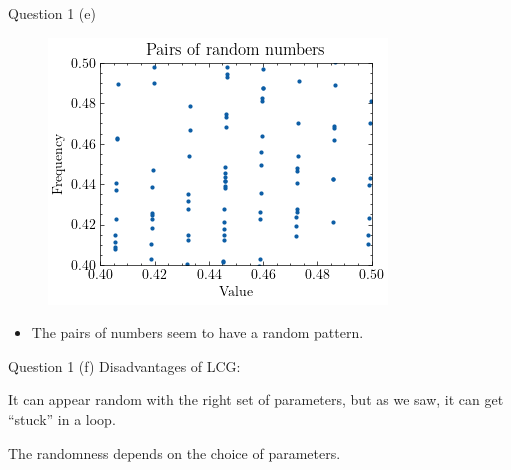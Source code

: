 \documentclass[compress,12pt]{beamer}
\begin{document}
\begin{frame}{Question 1 (e)}
      \begin{figure}
            \centering
            \includegraphics[scale=0.6]{imgs/pairs.png}
      \end{figure}
      \begin{itemize}
            \item The pairs of numbers seem to have a random pattern.
      \end{itemize}
\end{frame}

\begin{frame}{Question 1 (f)}
      Disadvantages of LCG:
      \begin{itemize}
      \begin{tcolorbox}
            \item It can appear random with the right set of parameters, but as we saw, it can get ``stuck'' in a loop.
            \item The randomness depends on the choice of parameters.
        \end{tcolorbox}
      \end{itemize}

    
\end{frame}
\end{document}
